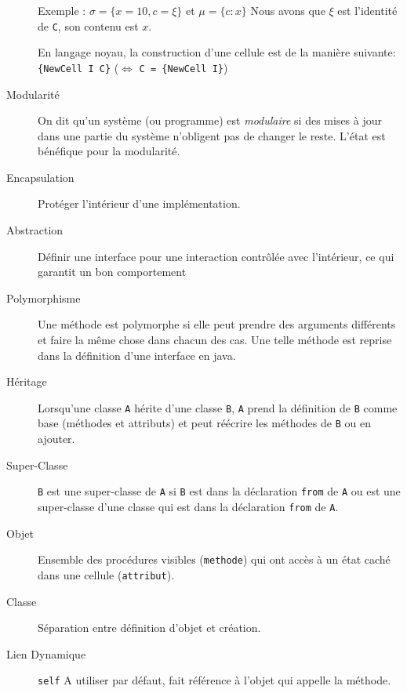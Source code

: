 \begin{description}
    Exemple : $\sigma = \{x=10, c=\xi\}$ et $\mu = \{c:x\}$
    Nous avons que $\xi$ est l'identité de \lstinline|C|, son contenu est $x$.

    En langage noyau, la construction d'une cellule est de la manière suivante:
    \lstinline|{NewCell I C}| ($\Leftrightarrow$ \lstinline|C = {NewCell I}|)

  \item[Modularité]
    On dit qu'un système (ou programme) est \emph{modulaire} si des mises
    à jour dans une partie du système n'obligent pas de changer le reste.
    L'état est bénéfique pour la modularité.

  \item[Encapsulation]
    Protéger l’intérieur d'une implémentation.

  \item[Abstraction]
    Définir une interface pour une
    interaction contrôlée avec l’intérieur, ce qui garantit
    un bon comportement

  \item[Polymorphisme]
    Une méthode est polymorphe si elle peut prendre
    des arguments différents et faire la même chose dans chacun des cas.
    Une telle méthode est reprise dans la définition d'une interface en java.

  \item[Héritage]
    Lorsqu'une classe \lstinline|A| hérite d'une classe \lstinline|B|,
    \lstinline|A| prend la définition de \lstinline|B|
    comme base (méthodes et attributs)
    et peut réécrire les méthodes de \lstinline|B| ou en ajouter.

  \item[Super-Classe]
    \lstinline|B| est une super-classe de \lstinline|A|
    si \lstinline|B| est dans la
    déclaration \lstinline|from| de \lstinline|A|
    ou est une super-classe d'une classe
    qui est dans la déclaration \lstinline|from| de \lstinline|A|.

  \item[Objet]
    Ensemble des procédures visibles (\lstinline|methode|) qui
    ont accès à un état caché dans une cellule (\lstinline|attribut|).

  \item[Classe]
    Séparation entre définition d'objet et création.

  \item[Lien Dynamique]
    \lstinline|self| A utiliser par défaut,
    fait référence à l'objet qui appelle la méthode.


\end{description}
